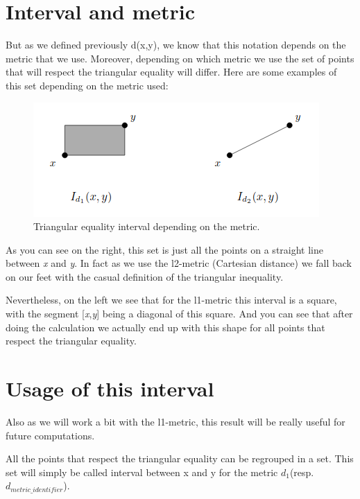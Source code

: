 \section{Interval and metric} %
	But as we defined previously d(x,y), we know that this notation depends on the metric that we use. Moreover, depending on which metric we use the set of points that will respect the triangular equality will differ. Here are some examples of this set depending on the metric used:
\begin{figure}[H]
  \includegraphics[width=\linewidth]{img/interval_example.png}
  \caption{Triangular equality interval depending on the metric.}
  \label{fig:interval_example}
\end{figure}

As you can see on the right, this set is just all the points on a straight line between \emph{x} and \emph{y}. In fact as we use the l2-metric (Cartesian distance) we fall back on our feet with the casual definition of the triangular inequality.

Nevertheless, on the left we see that for the l1-metric this interval is a square, with the segment [\emph{x},\emph{y}] being a diagonal of this square. And you can see that after doing the calculation we actually end up with this shape for all points that respect the triangular equality.

\section{Usage of this interval} %
Also as we will work a bit with the l1-metric, this result will be really useful for future computations.\newline

All the points that respect the triangular equality can be regrouped in a set. This set will simply be called interval between x and y for the metric $d_1$(resp. $d_{metric\_identifier}$).

